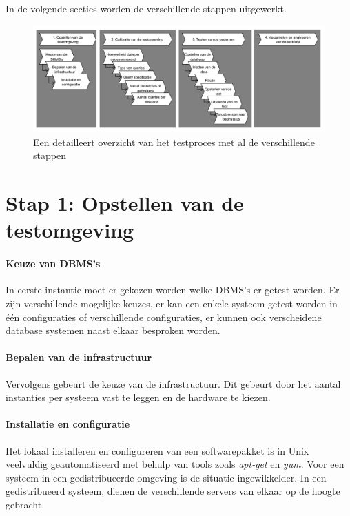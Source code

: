 In de volgende secties worden de verschillende stappen uitgewerkt.  
\begin{figure}[ht!]
\centering
\includegraphics[width=\linewidth]{img/Test-Process-Detailed-Overview}
\caption{Een detailleert overzicht van het testproces met al de verschillende stappen}
\label{fig:test-process-overview}
\end{figure}

\section{Stap 1: Opstellen van de testomgeving}
\paragraph{Keuze van DBMS's} In eerste instantie moet er gekozen worden welke DBMS's er getest worden. Er zijn verschillende mogelijke keuzes, er kan een enkele systeem getest worden in één configuraties of verschillende configuraties, er kunnen ook verscheidene database systemen naast elkaar besproken worden. 

\paragraph{Bepalen van de infrastructuur} Vervolgens gebeurt de keuze van de infrastructuur. Dit gebeurt door het aantal instanties per systeem vast te leggen en de hardware te kiezen. 

\paragraph{Installatie en configuratie} Het lokaal installeren en configureren van een softwarepakket is in Unix veelvuldig geautomatiseerd met behulp van tools zoals \textit{apt-get} en \textit{yum}. Voor een systeem in een gedistribueerde omgeving is de situatie ingewikkelder. In een gedistribueerd systeem, dienen de verschillende servers van elkaar op de hoogte gebracht.

